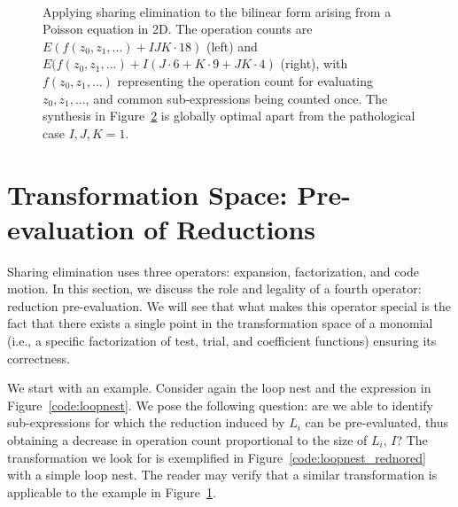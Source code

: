 \begin{figure}[h]
\begin{CenteredBox}
\begin{subfigure}{0.40\textwidth}
\captionsetup{skip=7pt}

\label{code:poisson_a}
\end{subfigure}
~~~~~~~~~~
\begin{subfigure}{0.40\textwidth}
\captionsetup{skip=7pt}

\label{code:poisson_b}
\end{subfigure}

\end{CenteredBox}
\caption{Applying sharing elimination to the bilinear form arising from a Poisson equation in 2D. The operation counts are $E(f(z_0, z_1, ...) + IJK \cdot 18)$ (left) and $E(f(z_0, z_1, ...) + I(J \cdot 6 + K \cdot 9 + JK \cdot 4)$ (right), with $f(z_0, z_1, ...)$ representing the operation count for evaluating $z_0, z_1, ...$, and common sub-expressions being counted once. The synthesis in Figure~\ref{code:poisson_b} is globally optimal apart from the pathological case  $I, J, K = 1$.}
\label{code:poisson}
\end{figure}


\section{Transformation Space: Pre-evaluation of Reductions}
\label{sec:pre-evaluation}
Sharing elimination uses three operators: expansion, factorization, and code motion. In this section, we discuss the role and legality of a fourth operator: reduction pre-evaluation. We will see that what makes this operator special is the fact that there exists a single point in the transformation space of a monomial (i.e., a specific factorization of test, trial, and coefficient functions) ensuring its correctness.

We start with an example. Consider again the loop nest and the expression in Figure~\ref{code:loopnest}. We pose the following question: are we able to identify sub-expressions for which the reduction induced by $L_i$ can be pre-evaluated, thus obtaining a decrease in operation count proportional to the size of $L_i$, $I$? The transformation we look for is exemplified in Figure~\ref{code:loopnest_rednored} with a simple loop nest. The reader may verify that a similar transformation is applicable to the example in Figure~\ref{code:poisson_a}.

